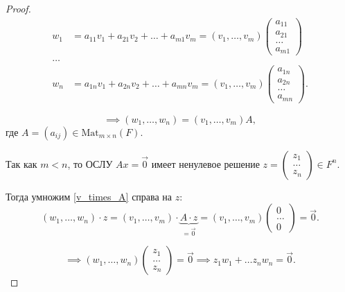 \documentclass[a4paper]{article}
\begin{document}
\begin{colloq}
            \begin{proof}
                \begin{align*}
                    w_1 &= a_{11} v_1 + a_{21} v_2 + \dots + a_{m1} v_m = (v_1, \dots, v_m) \begin{pmatrix} a_{11} \\ a_{21} \\ \dots \\ a_{m1} \end{pmatrix} \\
                    \dots\\
                    w_n &= a_{1n} v_1 + a_{2n} v_2 + \dots + a_{mn} v_m = (v_1, \dots, v_m) \begin{pmatrix} a_{1n} \\ a_{2n} \\ \dots \\ a_{mn} \end{pmatrix}
                .\end{align*}

                \begin{equation*}
                    \tag{$\star$}
                    \label{v_times_A}
                    \implies (w_1, \dots, w_n) = (v_1, \dots, v_m) A
                ,\end{equation*}
                где $A = (a_{ij}) \in \text{Mat}_{m \times n} (F)$.

                Так как $m < n$, то ОСЛУ $Ax = \overrightarrow{0}$ имеет ненулевое решение $z = \begin{pmatrix} z_1 \\ \dots \\ z_n \end{pmatrix} \in F^n$.

                Тогда умножим \eqref{v_times_A} справа на $z$:
                \begin{equation*}
                    (w_1, \dots, w_n) \cdot z = (v_1, \dots, v_m) \cdot \underbrace{A \cdot z}_{= \overrightarrow{0}} = (v_1, \dots, v_m) \begin{pmatrix} 0 \\ \dots \\ 0 \end{pmatrix} = \overrightarrow{0}
                .\end{equation*}

                \begin{equation*}
                    \implies (w_1, \dots, w_n) \begin{pmatrix} z_1 \\ \dots \\ z_n \end{pmatrix} = \overrightarrow{0} \implies z_1 w_1 + \dots z_n w_n = \overrightarrow{0}
                .\end{equation*}


\end{proof}
\end{colloq}
\end{document}
